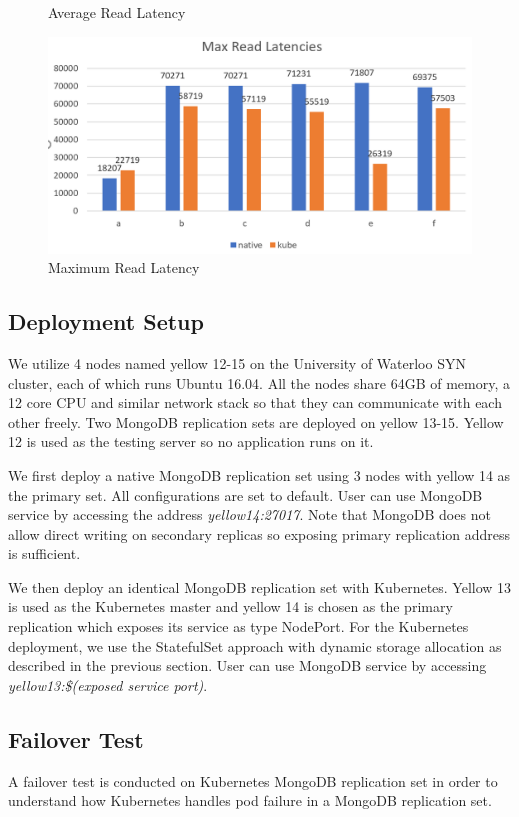 \documentclass[sigconf]{acmart}
\begin{document}
\begin{figure}[ht]
\begin{minipage}[b]{0.45\linewidth}
    \caption{Average Read Latency} 
    \vspace{4ex}
  \end{minipage}%
  \begin{minipage}[b]{0.45\linewidth}
    \centering
    \includegraphics[width=.8\linewidth]{figures/max.png} 
    \caption{Maximum Read Latency} 
    \vspace{4ex}
  \end{minipage} 
\end{figure}

\subsection{Deployment Setup}
We utilize 4 nodes named yellow 12-15 on the University of Waterloo SYN cluster, each of which runs Ubuntu 16.04. All the nodes share 64GB of memory, a 12 core CPU and similar network stack so that they can communicate with each other freely. Two MongoDB replication sets are deployed on yellow 13-15. Yellow 12 is used as the testing server so no application runs on it.

We first deploy a native MongoDB replication set using 3 nodes with yellow 14 as the primary set. All configurations are set to default. User can use MongoDB service by accessing the address \emph{yellow14:27017}. Note that MongoDB does not allow direct writing on secondary replicas so exposing primary replication address is sufficient.

We then deploy an identical MongoDB replication set with Kubernetes. Yellow 13 is used as the Kubernetes master and yellow 14 is chosen as the primary replication which exposes its service as type NodePort. For the Kubernetes deployment, we use the StatefulSet approach with dynamic storage allocation as described in the previous section. User can use MongoDB service by accessing \emph{yellow13:\$(exposed service port)}.

\subsection{Failover Test}
A failover test is conducted on Kubernetes MongoDB replication set in order to understand how Kubernetes handles pod failure in a MongoDB replication set.
\end{document}
